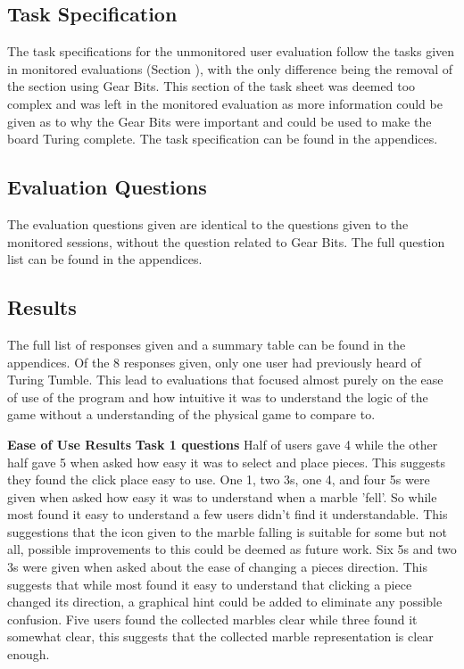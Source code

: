 \documentclass{l4proj}
\begin{document}
\subsection{Task Specification}
The task specifications for the unmonitored user evaluation follow the tasks given in monitored evaluations (Section ), with the only difference being the removal of the section using Gear Bits. This section of the task sheet was deemed too complex and was left in the monitored evaluation as more information could be given as to why the Gear Bits were important and could be used to make the board Turing complete. The task specification can be found in the appendices.

\subsection{Evaluation Questions}
The evaluation questions given are identical to the questions given to the monitored sessions, without the question related to Gear Bits. The full question list can be found in the appendices.   

\subsection{Results}
The full list of responses given and a summary table can be found in the appendices. Of the 8 responses given, only one user had previously heard of Turing Tumble. This lead to evaluations that focused almost purely on the ease of use of the program and how intuitive it was to understand the logic of the game without a understanding of the physical game to compare to. 

\textbf{Ease of Use Results}
\textbf{Task 1 questions}
Half of users gave 4 while the other half gave 5 when asked how easy it was to select and place pieces. This suggests they found the click place easy to use. One 1, two 3s, one 4, and four 5s were given when asked how easy it was to understand when a marble 'fell'. So while most found it easy to understand a few users didn't find it understandable. This suggestions that the icon given to the marble falling is suitable for some but not all, possible improvements to this could be deemed as future work. Six 5s and two 3s were given when asked about the ease of changing a pieces direction. This suggests that while most found it easy to understand that clicking a piece changed its direction, a graphical hint could be added to eliminate any possible confusion. Five users found the collected marbles clear while three found it somewhat clear, this suggests that the collected marble representation is clear enough.
\end{document}
